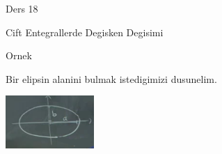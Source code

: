 \documentclass[12pt,fleqn]{article}
\begin{document}
Ders 18

Cift Entegrallerde Degisken Degisimi 

Ornek 

Bir elipsin alanini bulmak istedigimizi dusunelim. 

\includegraphics[height=2cm]{18_1.png}
\end{document}
